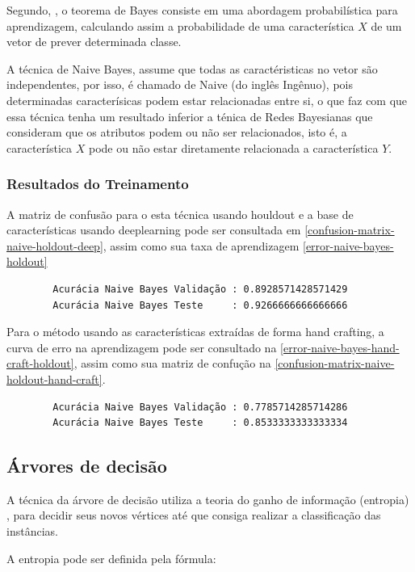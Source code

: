 \documentclass[
article,			%
11pt,				%
oneside,			%
a4paper,			%
english,			%
brazil,				%
sumario=tradicional,
]{abntex2}
\begin{document}
	Segundo, , o teorema de Bayes consiste em uma abordagem probabilística para aprendizagem, calculando assim a probabilidade de uma característica \(X\) de um vetor de prever determinada classe.
	
	A técnica de Naive Bayes, assume que todas as caractéristicas no vetor são independentes, por isso, é chamado de Naive (do inglês Ingênuo), pois determinadas caracterísicas podem estar relacionadas entre si, o que faz com que essa técnica tenha um resultado inferior a ténica de Redes Bayesianas que consideram que os atributos podem ou não ser relacionados, isto é, a característica \(X\) pode ou não estar diretamente relacionada a característica \(Y\).
	
	\subsubsection{Resultados do Treinamento}
	
	A matriz de confusão para o esta técnica usando houldout e a base de características usando deeplearning pode ser consultada em \autoref{confusion-matrix-naive-holdout-deep}, assim como sua taxa de aprendizagem \autoref{error-naive-bayes-holdout}
	
	\begin{verbatim}
		Acurácia Naive Bayes Validação : 0.8928571428571429
		Acurácia Naive Bayes Teste     : 0.9266666666666666
	\end{verbatim}
	
	Para o método usando as características extraídas de forma hand crafting, a curva de erro na aprendizagem pode ser consultado na \autoref{error-naive-bayes-hand-craft-holdout}, assim como sua matriz de confução na \autoref{confusion-matrix-naive-holdout-hand-craft}.
	
	\begin{verbatim}
		Acurácia Naive Bayes Validação : 0.7785714285714286
		Acurácia Naive Bayes Teste     : 0.8533333333333334
	\end{verbatim}
	
	\subsection{Árvores de decisão}
	
	A técnica da árvore de decisão utiliza a teoria do ganho de informação (entropia) , para decidir seus novos vértices até que consiga realizar a classificação das instâncias.
	
	A entropia pode ser definida pela fórmula:
	
\end{document}
